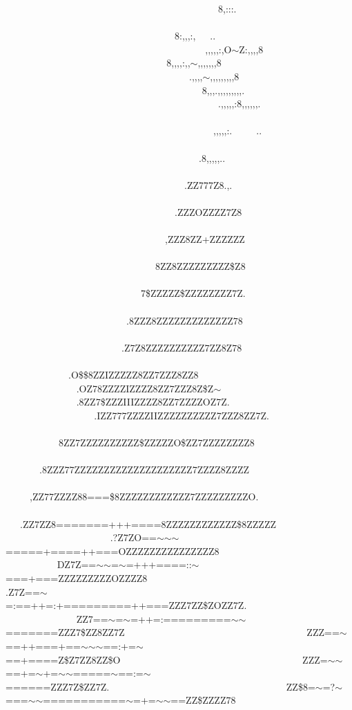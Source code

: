                                             8,\+:\+:\+:.                                                                          8\+:,,,\+:,   ..                                                                    ,,,,,\+:,O$\sim$Z\+:,,,,8                                                     8,,,,\+:,,$\sim$,,,,,,,8                                                                .,,,,$\sim$,,,,,,,,,8                                                             8,,,.,,,,,,,,,.                                                                .,,,,,\+:8,,,,,,.                                                                 ,,,,,\+:.     ..                                                                .8,,,,,..                                                                     .\+Z\+Z777\+Z8.,.                                                                    .\+Z\+Z\+Z\+O\+Z\+Z\+Z\+Z7\+Z8                                                                   ,Z\+Z\+Z8\+Z\+Z+\+Z\+Z\+Z\+Z\+Z\+Z                                                                 8\+Z\+Z8\+Z\+Z\+Z\+Z\+Z\+Z\+Z\+ZZ\$\+Z8                                                              7\$\+Z\+Z\+Z\+ZZ\$\+Z\+Z\+Z\+Z\+Z\+Z\+Z\+Z7\+Z.\+                                                           .8\+Z\+Z\+Z8\+Z\+Z\+Z\+Z\+Z\+Z\+Z\+Z\+Z\+Z\+Z\+Z\+Z78                                                           .\+Z7\+Z8\+Z\+Z\+Z\+Z\+Z\+Z\+Z\+Z\+Z\+Z7\+Z\+Z8\+Z78                                                       .\+O\$\$8\+Z\+Z\+I\+Z\+Z\+Z\+Z\+Z8\+Z\+Z7\+Z\+Z\+Z8\+Z\+Z8                                                 .\+O\+Z78\+Z\+Z\+Z\+Z\+I\+Z\+Z\+Z\+Z8\+Z\+Z7\+Z\+Z\+Z8Z\$Z$\sim$                                           .8\+Z\+Z7\$\+Z\+Z\+Z\+I\+I\+I\+Z\+Z\+Z\+Z8\+Z\+Z7\+Z\+Z\+Z\+Z\+O\+Z7\+Z.\+                                             .\+I\+Z\+Z777\+Z\+Z\+Z\+Z\+I\+I\+Z\+Z\+Z\+Z\+Z\+Z\+Z\+Z\+Z\+Z7\+Z\+Z\+Z8\+Z\+Z7\+Z.\+                                            8\+Z\+Z7\+Z\+Z\+Z\+Z\+Z\+Z\+Z\+Z\+ZZ\$\+Z\+Z\+Z\+Z\+ZO\$\+Z\+Z7\+Z\+Z\+Z\+Z\+Z\+Z\+Z\+Z8                                           .8\+Z\+Z\+Z77\+Z\+Z\+Z\+Z\+Z\+Z\+Z\+Z\+Z\+Z\+Z\+Z\+Z\+Z\+Z\+Z\+Z\+Z\+Z\+Z7\+Z\+Z\+Z\+Z8\+Z\+Z\+Z\+Z                                          ,Z\+Z77\+Z\+Z\+Z\+Z88===\$8\+Z\+Z\+Z\+Z\+Z\+Z\+Z\+Z\+Z\+Z\+Z\+Z7\+Z\+Z\+Z\+Z\+Z\+Z\+Z\+Z\+ZO.                                       .\+Z\+Z7\+Z\+Z8=======+++====8\+Z\+Z\+Z\+Z\+Z\+Z\+Z\+Z\+Z\+Z\+ZZ\$8\+Z\+Z\+Z\+Z\+Z                                      .?Z7\+ZO==$\sim$$\sim$$\sim$=====+====++===O\+Z\+Z\+Z\+Z\+Z\+Z\+Z\+Z\+Z\+Z\+Z\+Z\+Z\+Z\+Z8                                      \+D\+Z7Z==$\sim$$\sim$=$\sim$=+++====\+:\+:$\sim$===+===Z\+Z\+Z\+Z\+Z\+Z\+Z\+Z\+Z\+O\+Z\+Z\+Z\+Z8                                     .Z7Z==$\sim$=\+:==++=\+:+=========++===Z\+Z\+Z7\+ZZ\$\+Z\+O\+Z\+Z7\+Z.\+                                     Z\+Z7==$\sim$=$\sim$=++=\+:=========$\sim$$\sim$=======Z\+Z\+Z7\$\+Z\+Z8\+Z\+Z7\+Z                                      Z\+ZZ==$\sim$==++===+==$\sim$$\sim$$\sim$==\+:+=$\sim$==+====Z\$\+Z7\+Z\+Z8\+ZZ\$\+O                                      Z\+ZZ=$\sim$$\sim$==+=$\sim$+=$\sim$$\sim$=====$\sim$==\+:=$\sim$======Z\+Z\+Z7Z\$\+Z\+Z7\+Z.\+                                     ZZ\$8=$\sim$=?$\sim$===$\sim$$\sim$===========$\sim$=+=$\sim$$\sim$==ZZ\$\+Z\+Z\+Z\+Z78             
